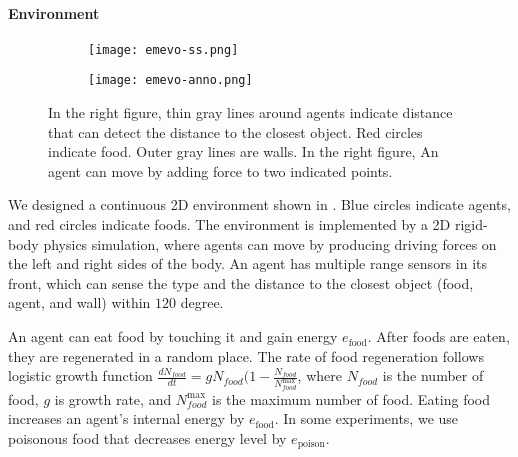 \paragraph{Environment}

\begin{figure}[t]
  \begin{subfigure}[t]{6cm}
    \centering
    \texttt{[image: emevo-ss.png]}
  \end{subfigure}
  \begin{subfigure}[t]{8cm}
    \centering
    \texttt{[image: emevo-anno.png]}
  \end{subfigure}
  \caption{
    In the right figure, thin gray lines around agents indicate distance that can detect the distance to the closest object. Red circles indicate food. Outer gray lines are walls.
    In the right figure, An agent can move by adding force to two indicated points.
  }\label{figure:env}
\end{figure}

We designed a continuous 2D environment shown in . Blue circles indicate agents, and red circles indicate foods. The environment is implemented by a 2D rigid-body physics simulation, where agents can move by 
producing driving forces on the left and right sides of the body.
An agent has multiple range sensors in its front, which can sense the type and the distance to the closest object (food, agent, and wall) within $120$ degree.

An agent can eat food by touching it and gain energy $e_{\mathrm{food}}$. After foods are eaten, they are regenerated in a random place.
The rate of food regeneration follows logistic growth function $\frac{dN_{food}}{dt} = g N_{food} (1 - \frac{N_{food}}{N_{food}^{\mathrm{max}}}$, where $N_{food}$ is the number of food, $g$ is growth rate, and $N_{food}^{\mathrm{max}}$ is the maximum number of food. 
Eating food increases an agent's internal energy by $e_{\mathrm{food}}$. In some experiments, we use poisonous food that decreases energy level by $e_{\mathrm{poison}}$.

